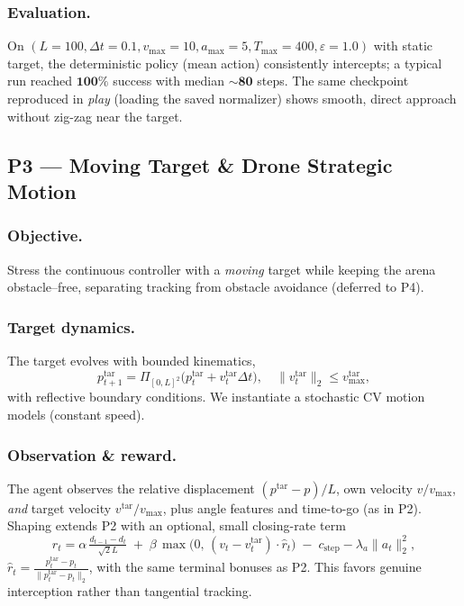         \subsubsection{Evaluation.}
            On $(L{=}100,\Delta t{=}0.1,v_{\max}{=}10,a_{\max}{=}5,T_{\max}{=}400,\varepsilon{=}1.0)$ with static target, the deterministic policy (mean action) consistently intercepts; a typical run reached $\textbf{100\%}$ success with median $\sim$$\mathbf{80}$ steps. The same checkpoint reproduced in \emph{play} (loading the saved normalizer) shows smooth, direct approach without zig-zag near the target.

    \subsection{P3 — Moving Target \& Drone Strategic Motion}
        \subsubsection{Objective.}
            Stress the continuous controller with a \emph{moving} target while keeping the arena obstacle–free, separating tracking from obstacle avoidance (deferred to P4).

        \subsubsection{Target dynamics.}
            The target evolves with bounded kinematics,
            \[
              p^{\mathrm{tar}}_{t+1}=\Pi_{[0,L]^2}\!\big(p^{\mathrm{tar}}_t + v^{\mathrm{tar}}_t \Delta t\big),\quad
              \|v^{\mathrm{tar}}_t\|_2\le v^{\mathrm{tar}}_{\max},
            \]
            with reflective boundary conditions. We instantiate a stochastic CV motion models (constant speed).

        \subsubsection{Observation \& reward.}
            The agent observes the relative displacement $(p^{\mathrm{tar}}{-}p)/L$, own velocity $v/v_{\max}$, \emph{and} target velocity $v^{\mathrm{tar}}/v_{\max}$, plus angle features and time-to-go (as in P2). Shaping extends P2 with an optional, small closing-rate term
            \[
              r_t=\alpha\,\tfrac{d_{t-1}-d_t}{\sqrt{2}L}\;+\;\beta\,\max\!\big(0,\,(v_t{-}v^{\mathrm{tar}}_t)\!\cdot\!\hat r_t\big)\;-\;c_{\text{step}}-\lambda_a\|a_t\|_2^2,
            \]
            $\hat r_t=\tfrac{p^{\mathrm{tar}}_t-p_t}{\|p^{\mathrm{tar}}_t-p_t\|_2}$, with the same terminal bonuses as P2. This favors genuine interception rather than tangential tracking.

